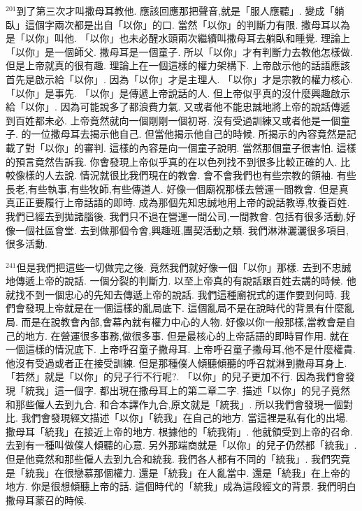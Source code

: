 \documentclass{book}
\begin{document}
$^{201}$到了第三次才叫撒母耳教他.
應該回應那把聲音,就是「服人應聽」.
變成「躺臥」這個字兩次都是出自「以你」的口.
當然「以你」的判斷力有限.
撒母耳以為是「以你」叫他.
「以你」也未必醒水頭兩次繼續叫撒母耳去躺臥和睡覺.
理論上「以你」是一個師父.
撒母耳是一個童子.
所以「以你」才有判斷力去教他怎樣做.
但是上帝就真的很有趣.
理論上在一個這樣的權力架構下.
上帝啟示他的話語應該首先是啟示給「以你」.
因為「以你」才是主理人.
「以你」才是宗教的權力核心.
「以你」是事先.
「以你」是傳遞上帝說話的人.
但上帝似乎真的沒什麼興趣啟示給「以你」.
因為可能說多了都浪費力氣.
又或者他不能忠誠地將上帝的說話傳遞到百姓都未必.
上帝竟然就向一個剛剛一個初哥.
沒有受過訓練又或者他是一個童子.
的一位撒母耳去揭示他自己.
但當他揭示他自己的時候.
所揭示的內容竟然是記載了對「以你」的審判.
這樣的內容是向一個童子說明.
當然那個童子很害怕.
這樣的預言竟然告訴我.
你會發現上帝似乎真的在以色列找不到很多比較正確的人.
比較像樣的人去說.
情況就很比我們現在的教會.
會不會我們也有些宗教的領袖.
有些長老,有些執事,有些牧師,有些傳道人.
好像一個廟祝那樣去營運一間教會.
但是真真正正要履行上帝話語的即時.
成為那個先知忠誠地用上帝的說話教導,牧養百姓.
我們已經去到拋諸腦後.
我們只不過在營運一間公司,一間教會.
包括有很多活動,好像一個社區會堂.
去到做那個令會,興趣班,團契活動之類.
我們淋淋灑灑很多項目,很多活動.

$^{241}$但是我們把這些一切做完之後.
竟然我們就好像一個「以你」那樣.
去到不忠誠地傳遞上帝的說話.
一個分裂的判斷力.
以至上帝真的有說話跟百姓去講的時候.
他就找不到一個忠心的先知去傳遞上帝的說話.
我們這種廟祝式的運作要到何時.
我們會發現上帝就是在一個這樣的亂局底下.
這個亂局不是在說時代的背景有什麼亂局.
而是在說教會內部,會幕內就有權力中心的人物.
好像以你一般那樣,當教會是自己的地方.
在營運很多事務,做很多事.
但是最核心的上帝話語的即時冒作用.
就在一個這樣的情況底下.
上帝呼召童子撒母耳.
上帝呼召童子撒母耳,他不是什麼權貴.
他沒有受過或者正在接受訓練.
但是那種僕人傾聽傾聽的呼召就淋到撒母耳身上.
「若然」就是「以你」的兒子行不行呢?.
「以你」的兒子更加不行.
因為我們會發現「統我」這一個字.
都出現在撒母耳上的第二章二字.
描述「以你」的兒子竟然和那些僱人去到九合.
和合本譯作九合,原文就是「統我」.
所以我們會發現一個對比.
我們會發現經文描述「以你」「統我」在自己的地方.
當這裡是私有化的出場.
撒母耳「統我」在接近上帝的地方.
根據他的「統我術」.
他就領受到上帝的召命.
去到有一種叫做僕人傾聽的心意.
另外那端商就是「以你」的兒子仍然都「統我」.
但是他竟然和那些僱人去到九合和統我.
我們各人都有不同的「統我」.
我們究竟是「統我」在很戀慕那個權力.
還是「統我」在人亂當中.
還是「統我」在上帝的地方.
你是很想傾聽上帝的話.
這個時代的「統我」成為這段經文的背景.
我們明白撒母耳蒙召的時候.
\end{document}
